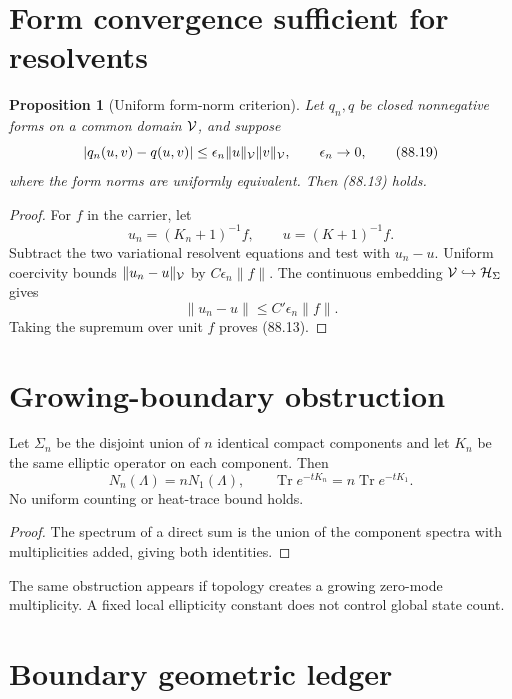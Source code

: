 \documentclass[11pt]{article}
\newtheorem{proposition}[theorem]{Proposition}
\theoremstyle{remark}
\begin{document}
\section{Form convergence sufficient for resolvents}

\begin{proposition}[Uniform form-norm criterion]
\label{prop:v15v88-forms}
Let \(q_n,q\) be closed nonnegative forms on a common domain
\({\cal V}\), and suppose
\[
 |q_n(u,v)-q(u,v)|
 \leq\epsilon_n
 \|u\|_{\cal V}\|v\|_{\cal V},\qquad\epsilon_n\to0,    \tag{88.19}
\]
where the form norms are uniformly equivalent.  Then (88.13)
holds.
\end{proposition}

\begin{proof}
For \(f\) in the carrier, let
\[
 u_n=(K_n+1)^{-1}f,\qquad u=(K+1)^{-1}f.
\]
Subtract the two variational resolvent equations and test with
\(u_n-u\).  Uniform coercivity bounds
\(\|u_n-u\|_{\cal V}\) by
\(C\epsilon_n\|f\|\).  The continuous embedding
\({\cal V}\hookrightarrow{\cal H}_\Sigma\) gives
\[
 \|u_n-u\|\leq C'\epsilon_n\|f\|.
\]
Taking the supremum over unit \(f\) proves (88.13).
\end{proof}

\section{Growing-boundary obstruction}

\begin{counterexample}
\label{cnt:v15v88-volume}
Let \(\Sigma_n\) be the disjoint union of \(n\) identical compact
components and let \(K_n\) be the same elliptic operator on each
component.  Then
\[
 N_n(\Lambda)=nN_1(\Lambda),\qquad
 \operatorname{Tr}e^{-tK_n}
 =
 n\operatorname{Tr}e^{-tK_1}.                        \tag{88.20}
\]
No uniform counting or heat-trace bound holds.
\end{counterexample}

\begin{proof}
The spectrum of a direct sum is the union of the component spectra
with multiplicities added, giving both identities.
\end{proof}

The same obstruction appears if topology creates a growing
zero-mode multiplicity.  A fixed local ellipticity constant does
not control global state count.

\section{Boundary geometric ledger}
\end{document}
